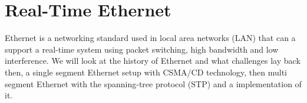 \chapter{Real-Time Ethernet} \label{ch:realTimeEthernet}

Ethernet is a networking standard used in local area networks (LAN) that can a support a real-time system using packet switching, high bandwidth and low interference. We will look at the history of Ethernet and what challenges lay back then, a single segment Ethernet setup with CSMA/CD technology, then multi segment Ethernet with the spanning-tree protocol (STP) and a implementation of it.



